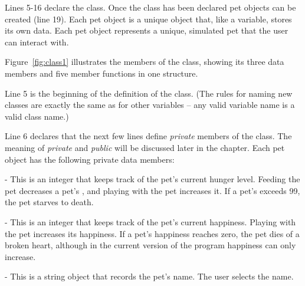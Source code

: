 
Lines 5-16 declare the  class.  
Once the  class has been declared pet objects can be created (line 19).  Each pet object is a unique object that, like a variable, stores its own data.  Each pet object represents a unique, simulated pet that the user can interact with.  

Figure~\ref{fig:class1} illustrates the members of the  class, showing its three data members and five member functions in one structure.

Line 5 is the beginning of the definition of the  class.  (The rules for naming new classes are exactly the same as for other variables -- any valid variable name is a valid class name.)

Line 6 declares that the next few lines define \emph{private} members of the  class.  The meaning of \emph{private} and \emph{public} will be discussed later in the chapter.  Each pet object has the following private data members:
\begin{tight_enumerate}
\item {} - This is an integer that keeps track of the pet's current hunger level.  Feeding the pet decreases a pet's , and playing with the pet increases it.  If a pet's  exceeds 99, the pet starves to death.
\item {} - This is an integer that keeps track of the pet's current happiness.  Playing with the pet increases its happiness.  If a pet's happiness reaches zero, the pet dies of a broken heart, although in the current version of the program happiness can only increase.
\item {} - This is a string object that records the pet's name.  The user selects the name.
\end{tight_enumerate}


